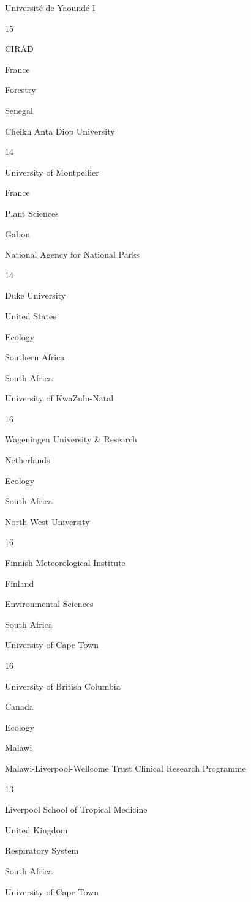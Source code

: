 \documentclass[
]{book}
\begin{document}
{Université de Yaoundé I }

{15}

{CIRAD }

{France }

{Forestry }

{Senegal }

{Cheikh Anta Diop University }

{14}

{University of Montpellier }

{France }

{Plant Sciences }

{Gabon }

{National Agency for National Parks }

{14}

{Duke University }

{United States }

{Ecology }

Southern Africa

{South Africa}

{University of KwaZulu-Natal }

{16}

{Wageningen University \& Research }

{Netherlands }

{Ecology }

{South Africa}

{North-West University }

{16}

{Finnish Meteorological Institute }

{Finland }

{Environmental Sciences }

{South Africa}

{University of Cape Town }

{16}

{University of British Columbia }

{Canada }

{Ecology }

{Malawi }

{Malawi-Liverpool-Wellcome Trust Clinical Research Programme}

{13}

{Liverpool School of Tropical Medicine}

{United Kingdom}

{Respiratory System }

{South Africa}

{University of Cape Town }
\end{document}
